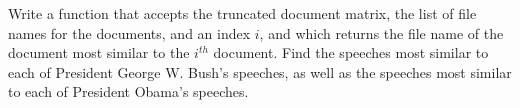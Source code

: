 \begin{problem}
Write a function that accepts the truncated document matrix, the list of file names 
for the documents, and an index $i$, and which returns the file name of the document 
most similar to the $i^{th}$ document. Find the speeches most similar to each of 
President George W. Bush's speeches, as well as the speeches most similar to 
each of President Obama's speeches.
\end{problem}
